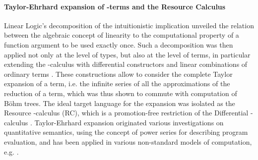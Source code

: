 \paragraph{Taylor-Ehrhard expansion of -terms and the Resource 
Calculus}
Linear Logic's decomposition of the intuitionistic implication unveiled the 
relation between the algebraic concept of linearity to the computational 
property of a function argument to be used exactly once.
Such a decomposition was then applied not only at the level of types, but also 
at the level of terms, in particular extending the -calculus with 
differential constructors and linear combinations of ordinary terms 
\cite{EhrhardRegnier:2003}.
These constructions allow to consider the complete Taylor expansion of a term, 
i.e. the infinite series of all the approximations of the reduction of a term, 
which was thus shown to commute with computation of Böhm trees.
The ideal target language for the expansion was isolated as the Resource 
-calculus (RC), which is a promotion-free restriction of the 
Differential -calculus \cite{EhrhardRegnier:2006}.
Taylor-Ehrhard expansion originated various investigations on quantitative 
semantics, using the concept of power series for describing program evaluation, 
and has been applied in various non-standard models of computation, e.g.
\cite[for instance]{DanosEhrhard:2011,PaganiSelingerValiron:2014}.

